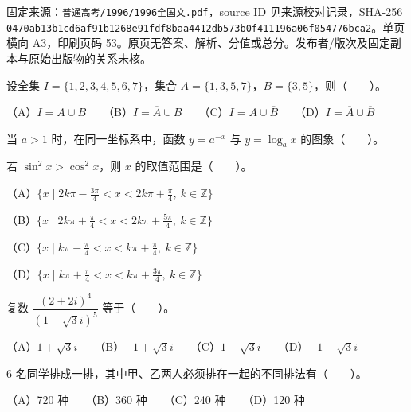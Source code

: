 

\begin{gktip}
固定来源：\texttt{普通高考/1996/1996全国文.pdf}，source ID 见来源校对记录，SHA-256 \texttt{0470ab13b1cd6af91b1268e91fdf8baa4412db573b0f411196a06f054776bca2}。单页横向 A3，印刷页码 53。原页无答案、解析、分值或总分。发布者/版次及固定副本与原始出版物的关系未核。
\end{gktip}

\begin{question}
设全集 $I=\{1,2,3,4,5,6,7\}$，集合 $A=\{1,3,5,7\}$，$B=\{3,5\}$，则\mbox{（　　）}。

（A）$I=A\cup B$　　（B）$I=\overline{A}\cup B$　　（C）$I=A\cup\overline{B}$　　（D）$I=\overline{A}\cup\overline{B}$

\Needspace{0.4\textheight}
\end{question}
\begin{question}
当 $a>1$ 时，在同一坐标系中，函数 $y=a^{-x}$ 与 $y=\log_a x$ 的图象\mbox{（　　）}。
\nopagebreak[4]
\begin{center}\end{center}
\nopagebreak[4]
\end{question}
\begin{question}
若 $\sin^2 x>\cos^2 x$，则 $x$ 的取值范围是\mbox{（　　）}。

（A）$\{x\mid 2k\pi-\frac{3\pi}{4}<x<2k\pi+\frac{\pi}{4},\ k\in\mathbb{Z}\}$

（B）$\{x\mid 2k\pi+\frac{\pi}{4}<x<2k\pi+\frac{5\pi}{4},\ k\in\mathbb{Z}\}$

（C）$\{x\mid k\pi-\frac{\pi}{4}<x<k\pi+\frac{\pi}{4},\ k\in\mathbb{Z}\}$

（D）$\{x\mid k\pi+\frac{\pi}{4}<x<k\pi+\frac{3\pi}{4},\ k\in\mathbb{Z}\}$

\end{question}
\begin{question}
复数 $\dfrac{(2+2i)^4}{(1-\sqrt{3}i)^5}$ 等于\mbox{（　　）}。

（A）$1+\sqrt{3}i$　　（B）$-1+\sqrt{3}i$　　（C）$1-\sqrt{3}i$　　（D）$-1-\sqrt{3}i$

\end{question}
\begin{question}
6 名同学排成一排，其中甲、乙两人必须排在一起的不同排法有\mbox{（　　）}。

（A）720 种　　（B）360 种　　（C）240 种　　（D）120 种

\end{question}

